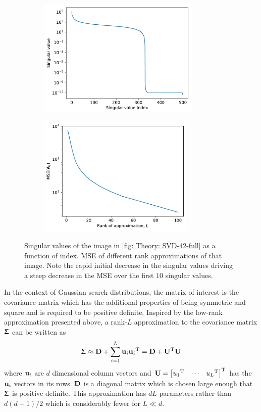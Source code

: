 \begin{figure}[tbp!]
    \begin{subfigure}[b]{0.49\textwidth}
        \centering
        \includegraphics[height=5.7cm]{graphics/svd/42-svds-log.pdf}
        \caption{}
        \label{fig: Theory: SVD-42-svds-log}
    \end{subfigure}
    \hfill
    \begin{subfigure}[b]{0.49\textwidth}
        \centering
        \includegraphics[height=5.7cm]{graphics/svd/42-MSE-log.pdf}
        \caption{}
        \label{fig: Theory: SVD-42-MSE}
    \end{subfigure}
    \caption{
         Singular values of the image in \autoref{fig: Theory: SVD-42-full} as a function of index.
         \gls{MSE} of different rank approximations of that image.  Note the rapid initial decrease in the singular values driving a steep decrease in the \gls{MSE} over the first $10$ singular values.
    }
    \label{fig: Theory: SVD: singular values and MSE}
\end{figure}

In the context of Gaussian search distributions, the matrix of interest is the covariance matrix which has the additional properties of being symmetric and square and is required to be positive definite. Inspired by the low-rank approximation presented above, a rank-$L$ approximation to the covariance matrix ${\boldsymbol{\Upsigma}}$ can be written as \cite{Hastie2009}
\begin{equation}
    {\boldsymbol{\Upsigma}} \approx {\mathbf{D}} + \sum_{i=1}^L {\mathbf{u}}_i{\mathbf{u}}_i{^\mathrm{T}} = {\mathbf{D}} + {\mathbf{U}}{^\mathrm{T}}{\mathbf{U}}
\end{equation}
where ${\mathbf{u}}_i$ are $d$ dimensional column vectors and ${\mathbf{U}}={\begin{bmatrix}u_1{^\mathrm{T}} & \cdots & u_L{^\mathrm{T}}\end{bmatrix}}^\text{T}$ has the ${\mathbf{u}}_i$ vectors in its rows. ${\mathbf{D}}$ is a diagonal matrix which is chosen large enough that ${\boldsymbol{\Upsigma}}$ is positive definite. This approximation has $dL$ parameters rather than $d(d+1)/2$ which is considerably fewer for $L\ll d$. 

